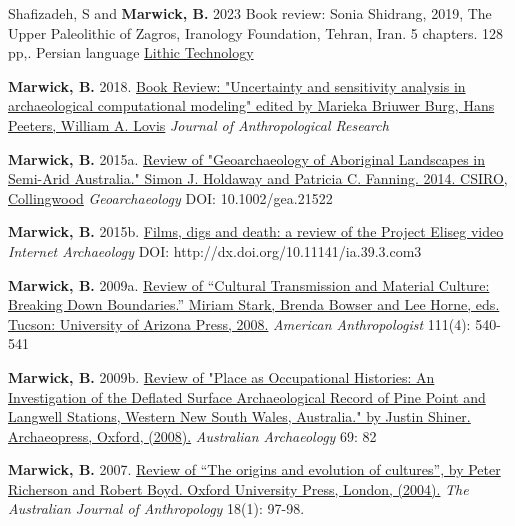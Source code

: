 \documentclass[11pt,article,oneside]{memoir}
\begin{document}
{{{{\bigskip


\ind Shafizadeh, S and \textbf{Marwick, B.} 2023 Book review: Sonia Shidrang, 2019, The Upper Paleolithic of Zagros, Iranology Foundation, Tehran, Iran. 5 chapters. 128 pp,. Persian language \href{https://doi.org/10.1080/01977261.2023.2185741}{Lithic Technology}

\ind \textbf{Marwick, B.} 2018. \href{https://osf.io/preprints/socarxiv/v5du3/}{Book Review: "Uncertainty and sensitivity analysis in archaeological computational modeling" edited by Marieka Briuwer Burg, Hans Peeters, William A. Lovis} \textit{Journal of Anthropological Research}
} 

\ind \textbf{Marwick, B.} 2015a. \href{https://www.academia.edu/15214960/Review_of_Geoarchaeology_of_Aboriginal_Landscapes_in_Semi-Arid_Australia._Simon_J._Holdaway_and_Patricia_C._Fanning._2014._CSIRO_Collingwood._Geoarchaeology_Article_first_published_online_26_AUG_2015_DOI_10.1002_gea.21522}{Review of "Geoarchaeology of Aboriginal Landscapes in Semi-Arid Australia." Simon J. Holdaway and Patricia C. Fanning. 2014. CSIRO, Collingwood} \textit{Geoarchaeology}  DOI: 10.1002/gea.21522

\ind \textbf{Marwick, B.} 2015b. \href{http://intarch.ac.uk/journal/issue39/3/comms.cfm#tabs-3}{Films, digs and death: a review of the Project Eliseg video} \textit{Internet Archaeology} DOI: http://dx.doi.org/10.11141/ia.39.3.com3

\ind \textbf{Marwick, B.} 2009a. \href{http://faculty.washington.edu/bmarwick/PDFs/Marwick_2009_AA_Stark_Review.pdf}{Review of “Cultural Transmission and Material Culture: Breaking Down Boundaries.” Miriam Stark, Brenda Bowser and Lee Horne, eds. Tucson: University of Arizona Press, 2008.} \textit{American Anthropologist} 111(4): 540-541

\ind \textbf{Marwick, B.} 2009b. \href{http://faculty.washington.edu/bmarwick/PDFs/Marwick_2009_Shiner_review.pdf}{Review of "Place as Occupational Histories: An Investigation of the Deflated Surface Archaeological Record of Pine Point and Langwell Stations, Western New South Wales, Australia." by Justin Shiner. Archaeopress, Oxford, (2008).} \textit{Australian Archaeology} 69: 82

\ind \textbf{Marwick, B.} 2007. \href{http://faculty.washington.edu/bmarwick/PDFs/Evolution.pdf}{Review of “The origins and evolution of cultures”, by Peter Richerson and Robert Boyd. Oxford University Press, London, (2004).} \textit{The Australian Journal of Anthropology} 18(1): 97-98.

}}}
\end{document}

